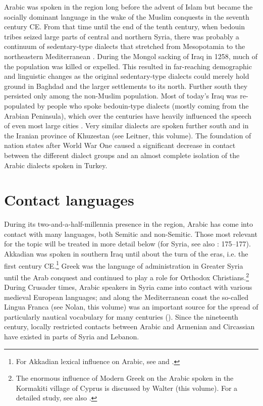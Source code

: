 \documentclass[output=paper]{langsci/langscibook}
\begin{document}
Arabic was spoken in the region long before the advent of Islam \citep[95]{Donner1981} but became the socially dominant language in the wake of the Muslim conquests in the seventh century CE. From that time until the end of the tenth century, when bedouin tribes seized large parts of central and northern Syria, there was probably a continuum of sedentary-type dialects that stretched from Mesopotamia to the northeastern Mediterranean \citep[291]{Procházka2018Fertile}. During the Mongol sacking of Iraq in 1258, much of the population was killed or expelled. This resulted in far-reaching demographic and linguistic changes as the original sedentary-type dialects could merely hold ground in Baghdad and the larger settlements to its north. Further south they persisted only among the non-Muslim population. Most of today’s Iraq was re-populated by people who spoke bedouin-type dialects (mostly coming from the Arabian Peninsula), which over the centuries have heavily influenced the speech of even most large cities \citep{Holes2007}. Very similar dialects are spoken further south and in the Iranian province of Khuzestan (see Leitner, this volume). The foundation of nation states after World War One caused a significant decrease in contact between the different dialect groups and an almost complete isolation of the Arabic dialects spoken in Turkey.

\section{Contact languages} 

During its two-and-a-half-millennia presence in the region, Arabic has come into contact with many languages, both Semitic and non-Semitic. Those most relevant for the topic will be treated in more detail below (for Syria, see also \citealt{Barbot1961}: 175--177). Akkadian was spoken in southern Iraq until about the turn of the eras, i.e. the first century CE.\footnote{For Akkadian lexical influence on Arabic, see \citet{Holes2002} and \citet{Krebernik2008}.} Greek was the language of administration in Greater Syria until the Arab conquest \citep[185--187]{Magidow2013} and continued to play a role for Orthodox Christians.\footnote{The enormous influence of Modern Greek on the Arabic spoken in the Kormakiti village of Cyprus is discussed by Walter (this volume). For a detailed study, see also \citet{Borg1985}.} During Crusader times, Arabic speakers in Syria came into contact with various medieval European languages; and along the Mediterranean coast the so-called Lingua Franca (see Nolan, this volume) was an important source for the spread of particularly nautical vocabulary for many centuries (\citealt{KahaneKahaneTietze1958}). Since the nineteenth century, locally restricted contacts between Arabic and Armenian and Circassian have existed in parts of Syria and Lebanon. 
\end{document}
